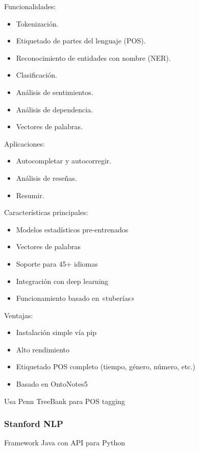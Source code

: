 \documentclass{report}
\begin{document}
Funcionalidades:
\begin{itemize}
    \item Tokenización.
    \item Etiquetado de partes del lenguaje (POS).
    \item Reconocimiento de entidades con nombre (NER).
    \item Clasificación.
    \item Análisis de sentimientos.
    \item Análisis de dependencia.
    \item Vectores de palabras.
\end{itemize}

Aplicaciones:

\begin{itemize}
    \item Autocompletar y autocorregir.
    \item Análisis de reseñas.
    \item Resumir.
\end{itemize}

Características principales:

\begin{itemize}
    \item Modelos estadísticos pre-entrenados
    \item Vectores de palabras
    \item Soporte para 45+ idiomas
    \item Integración con deep learning
    \item Funcionamiento basado en «tuberías»
\end{itemize}

Ventajas:

\begin{itemize}
    \item Instalación simple vía pip
    \item Alto rendimiento
    \item Etiquetado POS completo (tiempo, género, número, etc.)
    \item Basado en OntoNotes5
\end{itemize}

Usa Penn TreeBank para POS tagging

\subsubsection{Stanford NLP}
Framework Java con API para Python
\end{document}
